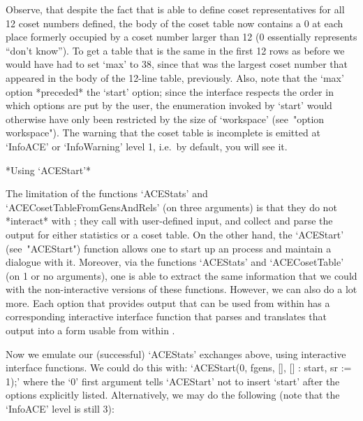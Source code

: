 Observe, that despite the fact that {\ACE} is  able  to  define  coset
representatives for all 12 coset numbers  defined,  the  body  of  the
coset table now contains a 0 at each  place  formerly  occupied  by  a
coset number larger than 12 (0 essentially represents ``don't know'').
To get a table that is the same in the first  12  rows  as  before  we
would have had to set `max' to 38, since that was  the  largest  coset
number that appeared in the body of  the  12-line  table,  previously.
Also, note that the `max' option *preceded* the `start' option;  since
the interface respects the order in which options are put by the user,
the enumeration invoked by `start'  would  otherwise  have  only  been
restricted by the size of `workspace'  (see~"option  workspace").  The
warning that the coset table is incomplete is emitted at `InfoACE'  or
`InfoWarning' level 1, i.e.~by default, you will see it.

*Using `ACEStart'*

The     limitation     of     the     functions     `ACEStats'     and
`ACECosetTableFromGensAndRels' (on three arguments) is  that  they  do
not *interact* with {\ACE}; they call {\ACE} with user-defined  input,
and collect and parse the output for  either  statistics  or  a  coset
table. On the other hand,  the  `ACEStart'  (see~"ACEStart")  function
allows one to start up an {\ACE} process and maintain a dialogue  with
it. Moreover, via the functions `ACEStats' and `ACECosetTable'  (on  1
or no arguments), one is able to extract the same information that  we
could with the non-interactive versions of these  functions.  However,
we can also do a lot more. Each {\ACE}  option  that  provides  output
that can be used from within {\GAP} has  a  corresponding  interactive
interface function that parses and translates that output into a  form
usable from within {\GAP}.

Now we emulate our  (successful)  `ACEStats'  exchanges  above,  using
interactive  {\ACE}  interface  functions.  We  could  do  this  with:
`ACEStart(0, fgens, [], [] : start, sr := 1);'  where  the  `0'  first
argument tells `ACEStart' not to  insert  `start'  after  the  options
explicitly listed. Alternatively, we may do the following  (note  that
the `InfoACE' level is still 3):

